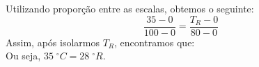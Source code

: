 %
%
	Utilizando proporção entre as escalas, obtemos o seguinte:
	\[\dfrac{35-0}{100-0}=\dfrac{T_{R}-0}{80-0}\]
	Assim, após isolarmos $T_{R}$, encontramos que: \\ Ou seja, $35\;^\circ C=28\;^\circ R$.
